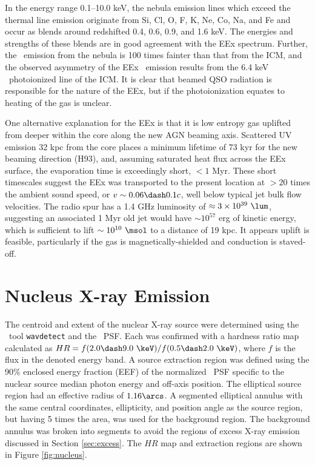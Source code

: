 \documentclass[useAMS,usenatbib]{mn2e}
\begin{document}
In the energy range 0.1--10.0 keV, the nebula emission lines which
exceed the thermal line emission originate from Si, Cl, O, F, K, Ne,
Co, Na, and Fe and occur as blends around redshifted 0.4, 0.6, 0.9,
and 1.6 keV. The energies and strengths of these blends are in good
agreement with the EEx spectrum. Further, the \feka\ emission from the
nebula is 100 times fainter than that from the ICM, and the observed
asymmetry of the EEx \feka\ emission results from the 6.4 keV
\feka\ photoionized line of the ICM. It is clear that beamed QSO
radiation is responsible for the nature of the EEx, but if the
photoionization equates to heating of the gas is unclear.

One alternative explanation for the EEx is that it is low entropy gas
uplifted from deeper within the core along the new AGN beaming
axis. Scattered UV emission 32 kpc from the core places a minimum
lifetime of 73 kyr for the new beaming direction (H93), and, assuming
saturated heat flux across the EEx surface, the evaporation time is
exceedingly short, $< 1$ Myr. These short timescales suggest the EEx
was transported to the present location at $> 20$ times the ambient
sound speed, or $v \sim 0.06 \dash 0.1c$, well below typical jet bulk
flow velocities. The radio spur has a 1.4 GHz luminosity of $\approx 3
\times 10^{39} ~\lum$, suggesting an associated 1 Myr old jet would
have $\sim 10^{57}$ erg of kinetic energy, which is sufficient to lift
$\sim 10^{10} ~\msol$ to a distance of 19 kpc. It appears uplift is
feasible, particularly if the gas is magnetically-shielded and
conduction is staved-off.

\section{Nucleus X-ray Emission}
\label{sec:centsrc}

The centroid and extent of the nuclear X-ray source were determined
using the \ciao\ tool {\tt wavdetect} and the \chandra\ PSF. Each was
confirmed with a hardness ratio map calculated as $HR = f(2.0 \dash
9.0 ~\keV) / f(0.5 \dash 2.0 ~\keV)$, where $f$ is the flux in the
denoted energy band. A source extraction region was defined using the
90\% enclosed energy fraction (EEF) of the normalized \chandra\ PSF
specific to the nuclear source median photon energy and off-axis
position. The elliptical source region had an effective radius of
$1.16\arcs$. A segmented elliptical annulus with the same central
coordinates, ellipticity, and position angle as the source region, but
having 5 times the area, was used for the background region. The
background annulus was broken into segments to avoid the regions of
excess X-ray emission discussed in Section \ref{sec:excess}. The $HR$
map and extraction regions are shown in Figure \ref{fig:nucleus}.
\end{document}
